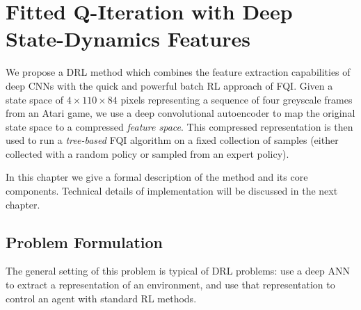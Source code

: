 \chapter{Fitted Q-Iteration with Deep State-Dynamics Features}
\label{ch3_setup}
\thispagestyle{empty}

\vspace{0.5cm}

\cite{lange2010deep}

\noindent We propose a DRL method which combines the feature extraction 
capabilities of deep CNNs with the quick and powerful batch RL approach of FQI. 
Given a state space of $4 \times 110 \times 84$ pixels representing a sequence
of four greyscale frames from an Atari game, we use a deep convolutional 
autoencoder to map the original state space to a compressed \textit{feature 
space}. This compressed representation is then used to run a \textit{tree-based}
FQI algorithm on a fixed collection of samples (either collected with a random 
policy or sampled from an expert policy).

In this chapter we give a formal description of the method and its core 
components. Technical details of implementation will be discussed in the next
chapter.

\section{Problem Formulation}
The general setting of this problem is typical of DRL problems: use a deep ANN 
to extract a representation of an environment, and use that representation to 
control an agent with standard RL methods. 

